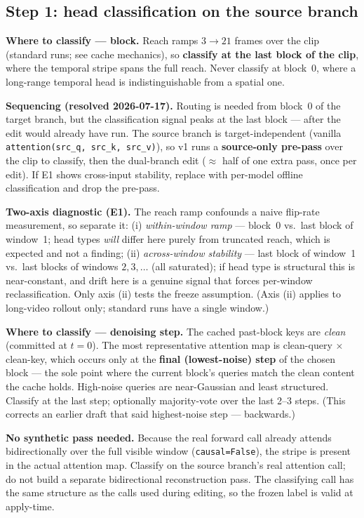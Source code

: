 \documentclass{article}
\begin{document}
\subsection{Step 1: head classification on the source branch}

\textbf{Where to classify --- block.} Reach ramps $3 \to 21$ frames over the
clip (standard runs; see cache mechanics), so \textbf{classify at the last
block of the clip}, where the temporal stripe spans the full reach. Never
classify at block~0, where a long-range temporal head is indistinguishable from
a spatial one.

\textbf{Sequencing (resolved 2026-07-17).} Routing is needed from block~0 of
the target branch, but the classification signal peaks at the last block ---
after the edit would already have run. The source branch is target-independent
(vanilla \texttt{attention(src\_q, src\_k, src\_v)}), so v1 runs a
\textbf{source-only pre-pass} over the clip to classify, then the dual-branch
edit ($\approx$ half of one extra pass, once per edit). If E1 shows cross-input
stability, replace with per-model offline classification and drop the
pre-pass.

\textbf{Two-axis diagnostic (E1).} The reach ramp confounds a naive flip-rate
measurement, so separate it: (i) \emph{within-window ramp} --- block~0 vs.\ last
block of window~1; head types \emph{will} differ here purely from truncated
reach, which is expected and not a finding; (ii) \emph{across-window stability}
--- last block of window~1 vs.\ last blocks of windows $2,3,\ldots$ (all
saturated); if head type is structural this is near-constant, and drift here is a
genuine signal that forces per-window reclassification. Only axis (ii) tests the
freeze assumption. (Axis (ii) applies to long-video rollout only; standard runs
have a single window.)

\textbf{Where to classify --- denoising step.} The cached past-block keys are
\emph{clean} (committed at $t=0$). The most representative attention map is
clean-query $\times$ clean-key, which occurs only at the \textbf{final
(lowest-noise) step} of the chosen block --- the sole point where the current
block's queries match the clean content the cache holds. High-noise queries are
near-Gaussian and least structured. Classify at the last step; optionally
majority-vote over the last 2--3 steps. (This corrects an earlier draft that
said highest-noise step --- backwards.)

\textbf{No synthetic pass needed.} Because the real forward call already attends
bidirectionally over the full visible window (\texttt{causal=False}), the stripe
is present in the actual attention map. Classify on the source branch's real
attention call; do not build a separate bidirectional reconstruction pass. The
classifying call has the same structure as the calls used during editing, so the
frozen label is valid at apply-time.
\end{document}
